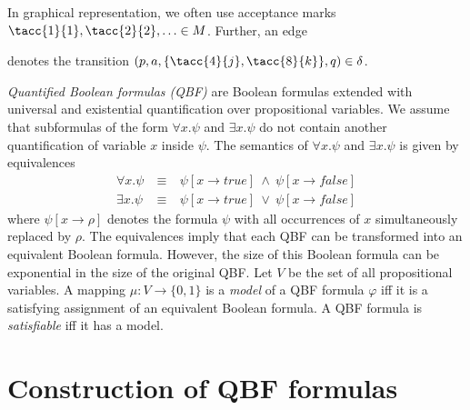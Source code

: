 \documentclass[a4paper,UKenglish,cleveref,autoref,thm-restate]{lipics-v2021}
\def\false{\mathit{false}}
\def\true{\mathit{true}}
\begin{document}
In graphical representation, we often use acceptance marks
$\tacc{1}{1},\tacc{2}{2},\ldots\in M$. Further, an edge 
denotes the transition $(p,a,\{\tacc{4}{j},\tacc{8}{k}\},q)\in\delta$. 

\bigskip

\emph{Quantified Boolean formulas (QBF)} are Boolean formulas
extended with universal and existential quantification over
propositional variables. We assume that subformulas of the form
$\forall x.\psi$ and $\exists x.\psi$ do not contain another
quantification of variable $x$ inside $\psi$. The semantics of
$\forall x.\psi$ and $\exists x.\psi$ is given by equivalences
\[
  \begin{array}{rcl}
    \forall x.\psi &~\equiv~& \psi[x\rightarrow\true]~\wedge~\psi[x\rightarrow\false]\\
    \exists x.\psi &~\equiv~& \psi[x\rightarrow\true]~\vee~   \psi[x\rightarrow\false]
  \end{array}
\]
where $\psi[x\rightarrow \rho]$ denotes the formula $\psi$ with all
occurrences of $x$ simultaneously replaced by $\rho$. The equivalences
imply that each QBF can be transformed into an equivalent Boolean
formula. However, the size of this Boolean formula can be exponential
in the size of the original QBF. Let $V$ be the set of all
propositional variables. A mapping $\mu:V\rightarrow\{0,1\}$
is a \emph{model} of a QBF formula $\varphi$ iff it is a satisfying
assignment of an equivalent Boolean formula. A QBF formula is
\emph{satisfiable} iff it has a model.



\section{Construction of QBF formulas}\label{sec:qbf}
\end{document}
